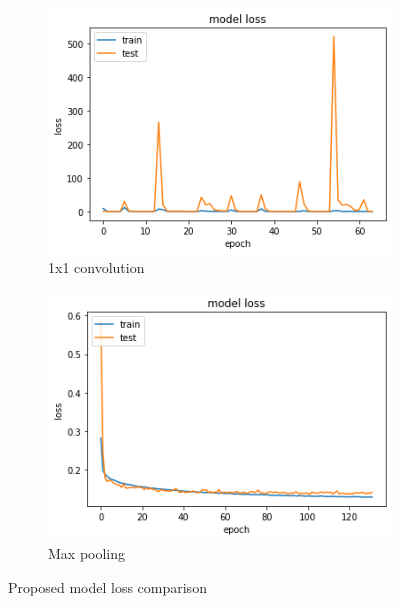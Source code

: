 \documentclass{article}
\begin{document}
\begin{figure}[H]
	\centering
	\begin{subfigure}{.5\textwidth}
		\centering
		\includegraphics[width=.95\linewidth]{./images/poly/new model_loss.png}
		\caption{1x1 convolution}
	\end{subfigure}%
	\begin{subfigure}{.5\textwidth}
		\centering
		\includegraphics[width=.95\linewidth]{./images/poly/new model_loss_new.png}
		\caption{Max pooling}
	\end{subfigure}
	\caption{Proposed model loss comparison}
	\label{fig:poly_new_loss}
\end{figure}

\end{document}
